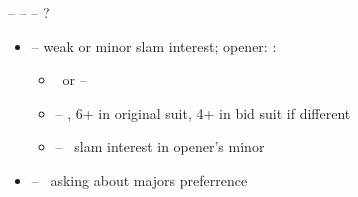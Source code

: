  --  --  -- ?
\begin{itemize}
  \item {} -- weak or minor slam interest; opener: :
  \begin{itemize}
    \item \pass\ or  -- \so
    \item {} -- \gf, 6+ in original suit, 4+ in bid suit if different
    \item {} -- \force\ slam interest in opener's minor
  \end{itemize}
  \item {} -- \gf\ asking about majors preferrence
\end{itemize}
